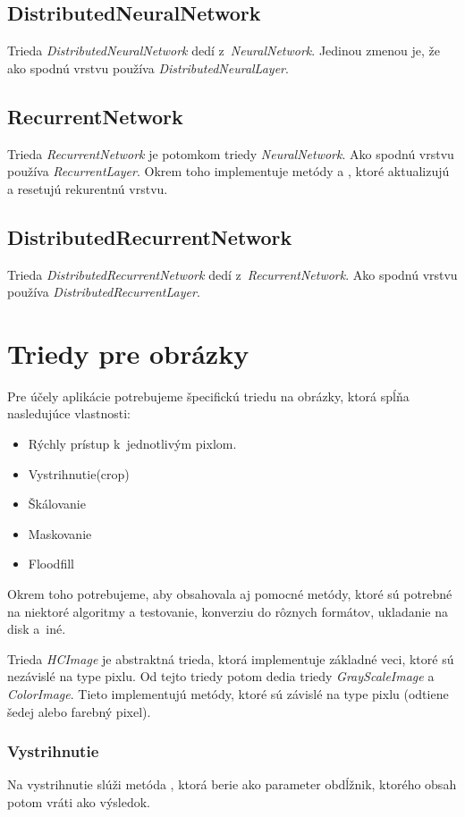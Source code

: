 \subsection{DistributedNeuralNetwork}
Trieda \textit{DistributedNeuralNetwork} dedí z~\textit{NeuralNetwork}. Jedinou zmenou je, že ako spodnú vrstvu používa \textit{DistributedNeuralLayer}.

\subsection{RecurrentNetwork}
Trieda \textit{RecurrentNetwork} je potomkom triedy \textit{NeuralNetwork}. Ako spodnú vrstvu používa \textit{RecurrentLayer}. Okrem toho implementuje metódy  a , ktoré aktualizujú a resetujú rekurentnú vrstvu.

\subsection{DistributedRecurrentNetwork}
Trieda \textit{DistributedRecurrentNetwork} dedí z~\textit{RecurrentNetwork}. Ako spodnú vrstvu používa \textit{DistributedRecurrentLayer}.

\section{Triedy pre obrázky}

Pre účely aplikácie potrebujeme špecifickú triedu na obrázky, ktorá spĺňa nasledujúce vlastnosti:
\begin{itemize}
\item Rýchly prístup k~jednotlivým pixlom.
\item Vystrihnutie(crop)
\item Škálovanie
\item Maskovanie
\item Floodfill
\end{itemize}
Okrem toho potrebujeme, aby obsahovala aj pomocné metódy, ktoré sú potrebné na niektoré algoritmy a testovanie, konverziu do rôznych formátov, ukladanie na disk a~iné.

Trieda \textit{HCImage} je abstraktná trieda, ktorá implementuje základné veci, ktoré sú nezávislé na type pixlu. Od tejto triedy potom dedia triedy \textit{GrayScaleImage} a \textit{ColorImage}. Tieto implementujú metódy, ktoré sú závislé na type pixlu (odtiene šedej alebo farebný pixel). 

\subsubsection{Vystrihnutie}
Na vystrihnutie slúži metóda , ktorá berie ako parameter obdĺžnik, ktorého obsah potom vráti ako výsledok. 

